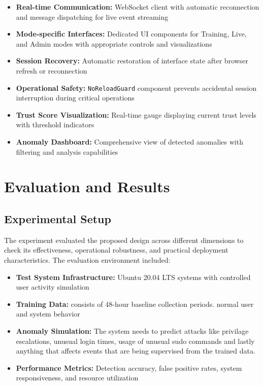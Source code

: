 \documentclass[conference]{IEEEtran}
\begin{document}
\begin{itemize}[leftmargin=*]
  \item \textbf{Real-time Communication:} WebSocket client with automatic reconnection and message dispatching for live event streaming
  \item \textbf{Mode-specific Interfaces:} Dedicated UI components for Training, Live, and Admin modes with appropriate controls and visualizations
  \item \textbf{Session Recovery:} Automatic restoration of interface state after browser refresh or reconnection
  \item \textbf{Operational Safety:} \texttt{NoReloadGuard} component prevents accidental session interruption during critical operations
  \item \textbf{Trust Score Visualization:} Real-time gauge displaying current trust levels with threshold indicators
  \item \textbf{Anomaly Dashboard:} Comprehensive view of detected anomalies with filtering and analysis capabilities
\end{itemize}

\section{Evaluation and Results}

\subsection{Experimental Setup}
The experiment evaluated the proposed design across different dimensions to check its effectiveness, operational robustness, and practical deployment characteristics. The evaluation environment included:

\begin{itemize}[leftmargin=*]
  \item \textbf{Test System Infrastructure:} Ubuntu 20.04 LTS systems with
controlled user activity simulation
  \item \textbf{Training Data:} consists of 48-hour baseline collection periods.
normal user and system behavior
  \item \textbf{Anomaly Simulation:} The system needs to predict attacks like privilage escalations, unusual login times, usage of unusual sudo commands and lastly anything that affects events that are being supervised from the trained data.
  \item \textbf{Performance Metrics:} Detection accuracy, false positive
rates, system responsiveness, and resource utilization
\end{itemize}
\end{document}

